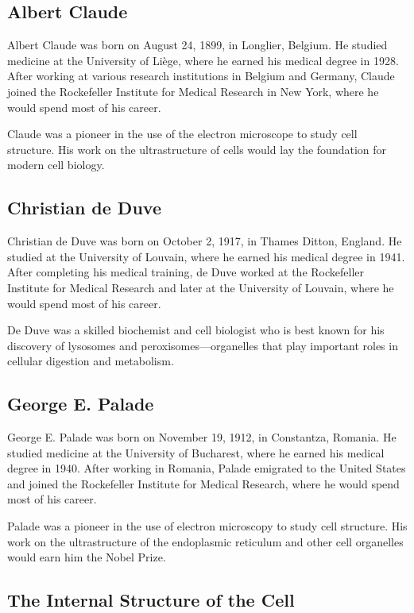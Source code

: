 \subsection{Albert Claude}

Albert Claude was born on August 24, 1899, in Longlier, Belgium. He studied medicine at the University of Li\`ege, where he earned his medical degree in 1928. After working at various research institutions in Belgium and Germany, Claude joined the Rockefeller Institute for Medical Research in New York, where he would spend most of his career.

Claude was a pioneer in the use of the electron microscope to study cell structure. His work on the ultrastructure of cells would lay the foundation for modern cell biology.

\subsection{Christian de Duve}

Christian de Duve was born on October 2, 1917, in Thames Ditton, England. He studied at the University of Louvain, where he earned his medical degree in 1941. After completing his medical training, de Duve worked at the Rockefeller Institute for Medical Research and later at the University of Louvain, where he would spend most of his career.

De Duve was a skilled biochemist and cell biologist who is best known for his discovery of lysosomes and peroxisomes---organelles that play important roles in cellular digestion and metabolism.

\subsection{George E. Palade}

George E. Palade was born on November 19, 1912, in Constantza, Romania. He studied medicine at the University of Bucharest, where he earned his medical degree in 1940. After working in Romania, Palade emigrated to the United States and joined the Rockefeller Institute for Medical Research, where he would spend most of his career.

Palade was a pioneer in the use of electron microscopy to study cell structure. His work on the ultrastructure of the endoplasmic reticulum and other cell organelles would earn him the Nobel Prize.

\subsection{The Internal Structure of the Cell}

